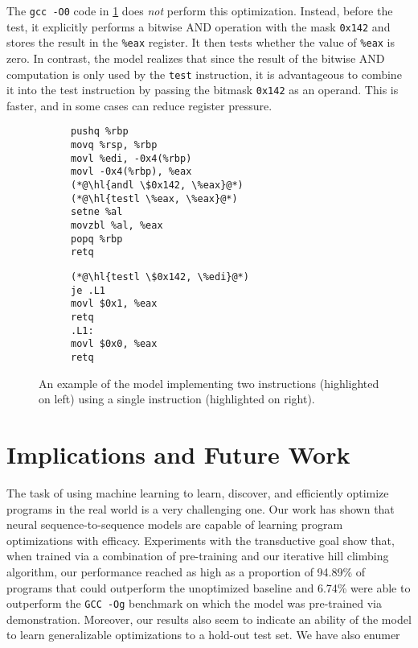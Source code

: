 \documentclass{article}
\begin{document}

The \texttt{gcc -O0} code in \cref{fig:test_and} does \emph{not} perform this optimization.  Instead, before the test, it explicitly performs a bitwise AND operation with the mask \lstinline{0x142} and stores the result in the \lstinline{%eax} register.  It then tests whether the value of \lstinline{%eax} is zero.  In contrast, the model realizes that since the result of the bitwise AND computation is only used by the \lstinline{test} instruction, it is advantageous to combine it into the test instruction by passing the bitmask \lstinline{0x142} as an operand.  This is faster, and in some cases can reduce register pressure.

\begin{figure}
    \centering
    \begin{subfigure}[t]{\codeboxwidth}
    \begin{lstlisting}
pushq %rbp
movq %rsp, %rbp
movl %edi, -0x4(%rbp)
movl -0x4(%rbp), %eax
(*@\hl{andl \$0x142, \%eax}@*)
(*@\hl{testl \%eax, \%eax}@*)
setne %al
movzbl %al, %eax
popq %rbp
retq
\end{lstlisting}
    \caption{\ozerocodecaption}
    \end{subfigure}
    \hfil
    \begin{subfigure}[t]{\codeboxwidth}
    \begin{lstlisting}
(*@\hl{testl \$0x142, \%edi}@*)
je .L1
movl $0x1, %eax
retq
.L1:
movl $0x0, %eax
retq
\end{lstlisting}
    \caption{\modelcodecaption}
    \end{subfigure}
    \caption{An example of the model implementing two instructions (highlighted on left) using a single instruction (highlighted on right).}
    \label{fig:test_and}
\end{figure}

\section{Implications and Future Work}


The task of using machine learning to learn, discover, and efficiently optimize programs in the real world is a very challenging one. Our work has shown that neural sequence-to-sequence models are capable of learning program optimizations with efficacy. Experiments with the transductive goal show that, when trained via a combination of pre-training and our iterative hill climbing algorithm, our performance reached as high as a proportion of 94.89\% of programs that could outperform the unoptimized baseline and 6.74\% were able to outperform the \texttt{GCC -Og} benchmark on which the model was pre-trained via demonstration. Moreover, our results also seem to indicate an ability of the model to learn generalizable optimizations to a hold-out test set. We have also enumer
\end{document}
